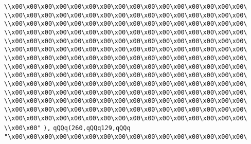 \verb|\\x00\x00\x00\x00\x00\x00\x00\x00\x00\x00\x00\x00\x00\x00\x00\x00\|\newline
\verb|\\x00\x00\x00\x00\x00\x00\x00\x00\x00\x00\x00\x00\x00\x00\x00\x00\|\newline
\verb|\\x00\x00\x00\x00\x00\x00\x00\x00\x00\x00\x00\x00\x00\x00\x00\x00\|\newline
\verb|\\x00\x00\x00\x00\x00\x00\x00\x00\x00\x00\x00\x00\x00\x00\x00\x00\|\newline
\verb|\\x00\x00\x00\x00\x00\x00\x00\x00\x00\x00\x00\x00\x00\x00\x00\x00\|\newline
\verb|\\x00\x00\x00\x00\x00\x00\x00\x00\x00\x00\x00\x00\x00\x00\x00\x00\|\newline
\verb|\\x00\x00\x00\x00\x00\x00\x00\x00\x00\x00\x00\x00\x00\x00\x00\x00\|\newline
\verb|\\x00\x00\x00\x00\x00\x00\x00\x00\x00\x00\x00\x00\x00\x00\x00\x00\|\newline
\verb|\\x00\x00\x00\x00\x00\x00\x00\x00\x00\x00\x00\x00\x00\x00\x00\x00\|\newline
\verb|\\x00\x00\x00\x00\x00\x00\x00\x00\x00\x00\x00\x00\x00\x00\x00\x00\|\newline
\verb|\\x00\x00\x00\x00\x00\x00\x00\x00\x00\x00\x00\x00\x00\x00\x00\x00\|\newline
\verb|\\x00\x00\x00\x00\x00\x00\x00\x00\x00\x00\x00\x00\x00\x00\x00\x00\|\newline
\verb|\\x00\x00\x00\x00\x00\x00\x00\x00\x00\x00\x00\x00\x00\x00\x00\x00\|\newline
\verb|\\x00\x00\x00\x00\x00\x00\x00\x00\x00\x00\x00\x00\x00\x00\x00\x00\|\newline
\verb|\\x00\x00"|\newline
\verb|),|\newline
\verb|qQQq(260,qQQq129,qQQq|\newline
\verb|"\x00\x00\x00\x00\x00\x00\x00\x00\x00\x00\x00\x00\x00\x00\x00\x00\|\newline
